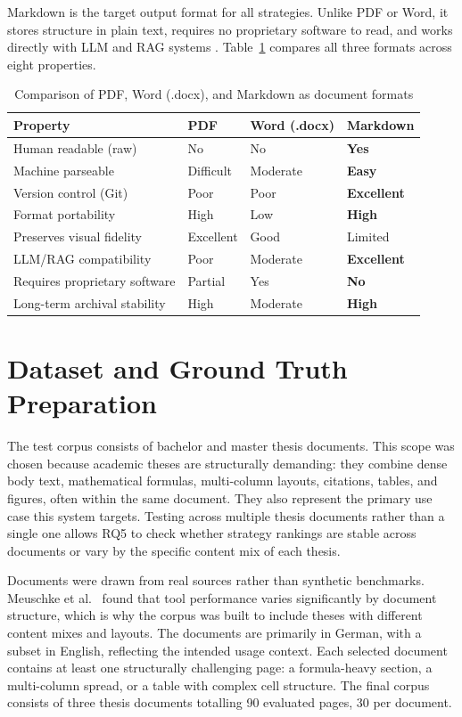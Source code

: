 Markdown is the target output format for all strategies. Unlike PDF or Word, it
stores structure in plain text, requires no proprietary software to read, and
works directly with LLM and RAG systems \autocite{cone2019, khan2024}.
Table~\ref{tab:format_comparison} compares all three formats across eight
properties.

\begin{table}[ht]
\centering
\caption{Comparison of PDF, Word (.docx), and Markdown as document formats}
\label{tab:format_comparison}
\renewcommand{\arraystretch}{1.4}
\begin{tabularx}{\textwidth}{lXXX}
\toprule
\textbf{Property} & \textbf{PDF} & \textbf{Word (.docx)} & \textbf{Markdown} \\
\midrule
Human readable (raw) & No & No & \textbf{Yes} \\
Machine parseable & Difficult & Moderate & \textbf{Easy} \\
Version control (Git) & Poor & Poor & \textbf{Excellent} \\
Format portability & High & Low & \textbf{High} \\
Preserves visual fidelity & Excellent & Good & Limited \\
LLM/RAG compatibility & Poor & Moderate & \textbf{Excellent} \\
Requires proprietary software & Partial & Yes & \textbf{No} \\
Long-term archival stability & High & Moderate & \textbf{High} \\
\bottomrule
\end{tabularx}
\end{table}

\section{Dataset and Ground Truth Preparation}

The test corpus consists of bachelor and master thesis documents. This scope
was chosen because academic theses are structurally demanding: they combine
dense body text, mathematical formulas, multi-column layouts, citations, tables,
and figures, often within the same document. They also represent the primary
use case this system targets. Testing across multiple thesis documents rather
than a single one allows RQ5 to check whether strategy rankings are stable
across documents or vary by the specific content mix of each thesis.

Documents were drawn from real sources rather than synthetic benchmarks.
Meuschke et al.\ \autocite{meuschke2023} found that tool performance varies
significantly by document structure, which is why the corpus was built to
include theses with different content mixes and layouts. The documents are
primarily in German, with a subset in English, reflecting the intended usage
context. Each selected document contains at least one structurally challenging
page: a formula-heavy section, a multi-column spread, or a table with complex
cell structure. The final corpus consists of three thesis documents totalling 90 evaluated
pages, 30 per document.

